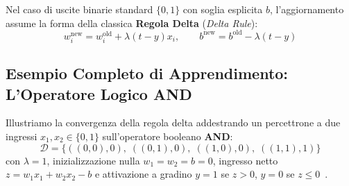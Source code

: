 Nel caso di uscite binarie standard $\{0, 1\}$ con soglia esplicita $b$, l'aggiornamento assume la forma della classica \textbf{Regola Delta} (\textit{Delta Rule}):
\begin{equation}
    w_i^{\text{new}} = w_i^{\text{old}} + \lambda (t - y) x_i, \qquad b^{\text{new}} = b^{\text{old}} - \lambda (t - y)
\end{equation}

\FloatBarrier
\subsection{Esempio Completo di Apprendimento: L'Operatore Logico AND}
\label{subsec:dm-perceptron-and-trace}

Illustriamo la convergenza della regola delta addestrando un percettrone a due ingressi $x_1, x_2 \in \{0, 1\}$ sull'operatore booleano \textbf{AND}:
\begin{equation*}
    \mathcal{D} = \big\{ ((0,0), 0), \; ((0,1), 0), \; ((1,0), 0), \; ((1,1), 1) \big\}
\end{equation*}
con $\lambda = 1$, inizializzazione nulla $w_1 = w_2 = b = 0$, ingresso netto $z = w_1 x_1 + w_2 x_2 - b$ e attivazione a gradino $y = 1$ se $z > 0$, $y = 0$ se $z \le 0$~\cite{tan2018}.

